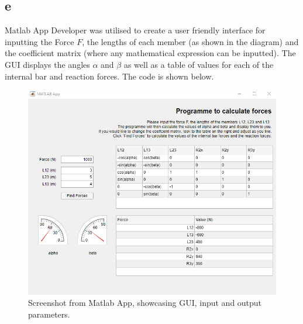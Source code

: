 \documentclass[11pt]{article}
\numberwithin{equation}{section}
\begin{document}
\subsection{e}
Matlab App Developer was utilised to create a user friendly interface for inputting the Force $F$, the lengths of each member (as shown in the diagram) and the coefficient matrix (where any mathematical expression can be inputted). The GUI displays the angles $\alpha$ and $\beta$ as well as a table of values for each of the internal bar and reaction forces. The code is shown below.

\begin{figure}[H]
    \centering
    \includegraphics[width = 0.75 \textwidth]{./img/q2e.png}
    \caption{Screenshot from Matlab App, showcasing GUI, input and output parameters.}
\end{figure}
\end{document}
